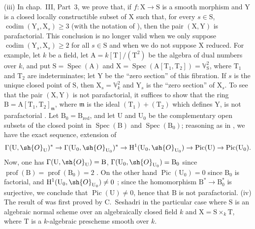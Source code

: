 \begin{env}[21.14.4]
(iii) In chap.~III, Part~3, we prove that, if $f:\mathrm{X}\to\mathrm{S}$ is a smooth morphism and $\mathrm{Y}$ is a closed locally constructible subset of $\mathrm{X}$ such that, for every $s\in\mathrm{S}$, $\operatorname{codim}(\mathrm{Y}_s,\mathrm{X}_s)\geq3$ (with the notation of ), then the pair $(\mathrm{X},\mathrm{Y})$ is parafactorial.
This conclusion is no longer valid when we only suppose $\operatorname{codim}(\mathrm{Y}_s,\mathrm{X}_s)\geq 2$ for all $s\in\mathrm{S}$ and when we do not suppose $\mathrm{X}$ reduced.
For example, let $k$ be a field, let $\mathrm{A}=k[\mathrm{T}]/(\mathrm{T}^2)$ be the algebra of dual numbers over $k$, and put $\mathrm{S}=\operatorname{Spec}(\mathrm{A})$ and $\mathrm{X}=\operatorname{Spec}(\mathrm{A}[\mathrm{T}_1,\mathrm{T}_2])=\mathbb{V}_{\mathrm{S}}^2$, where $\mathrm{T}_1$ and $\mathrm{T}_2$ are indeterminates; let $\mathrm{Y}$ be the ``zero section'' of this fibration. If $s$ is the unique closed point of $\mathrm{S}$, then $\mathrm{X}_s=\mathbb{V}_k^2$ and $\mathrm{Y}_s$ is the ``zero section'' of $\mathrm{X}_s$.
To see that the pair $(\mathrm{X},\mathrm{Y})$ is not parafactorial, it suffices to show that the ring $\mathrm{B}=\mathrm{A}[\mathrm{T}_1,\mathrm{T}_2]_\mathfrak{m}$, where $\mathfrak{m}$ is the ideal $(\mathrm{T}_1)+(\mathrm{T}_2)$ which defines $\mathrm{Y}$, is not parafactorial .
Let $\mathrm{B}_0=\mathrm{B}_{\mathrm{red}}$, and let $\mathrm{U}$ and $\mathrm{U}_0$ be the complementary open subsets of the closed point in $\operatorname{Spec}(\mathrm{B})$ and $\operatorname{Spec}(\mathrm{B}_0)$; reasoning as in , we have the exact sequence, extension of 
\[
  \Gamma(\mathrm{U},\sh{O}_{\mathrm{U}})^*\to\Gamma(\mathrm{U}_0,\sh{O}_{\mathrm{U}_0})^*\to\mathrm{H}^1(\mathrm{U}_0,\sh{O}_{\mathrm{U}_0})\to\operatorname{Pic}(\mathrm{U})\to\operatorname{Pic}(\mathrm{U}_0).
\]
Now, one has $\Gamma(\mathrm{U},\sh{O}_{\mathrm{U}})=\mathrm{B}$, $\Gamma(\mathrm{U}_0,\sh{O}_{\mathrm{U}_0})=\mathrm{B}_0$ since $\operatorname{prof}(\mathrm{B})=\operatorname{prof}(\mathrm{B}_0)=2$ .
On the other hand $\operatorname{Pic}(\mathrm{U}_0)=0$ since $\mathrm{B}_0$ is factorial, and $\mathrm{H}^1(\mathrm{U}_0,\sh{O}_{\mathrm{U}_0})\neq 0$ \cite[3, Example~III-1]{IV-41}; since the homomorphism $\mathrm{B}^*\to\mathrm{B}_0^*$ is surjective, we conclude that $\operatorname{Pic}(\mathrm{U})\neq 0$, hence that $\mathrm{B}$ is not parafactorial.
(iv) The result of  was first proved by C.~Seshadri \cite{IV-44} in the particular case where $\mathrm{S}$ is an algebraic normal scheme over an algebraically closed field $k$ and $\mathrm{X}=\mathrm{S}\times_k\mathrm{T}$, where $\mathrm{T}$ is a $k$-algebraic prescheme smooth over $k$.

\end{env}
